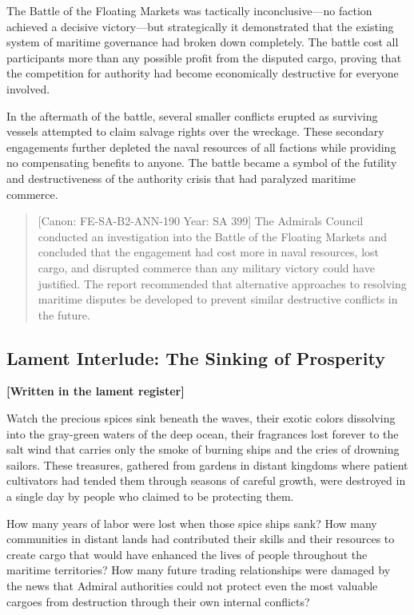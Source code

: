 The Battle of the Floating Markets was tactically inconclusive---no
faction achieved a decisive victory---but strategically it demonstrated
that the existing system of maritime governance had broken down
completely. The battle cost all participants more than any possible
profit from the disputed cargo, proving that the competition for
authority had become economically destructive for everyone involved.

In the aftermath of the battle, several smaller conflicts erupted as
surviving vessels attempted to claim salvage rights over the wreckage.
These secondary engagements further depleted the naval resources of all
factions while providing no compensating benefits to anyone. The battle
became a symbol of the futility and destructiveness of the authority
crisis that had paralyzed maritime commerce.

\begin{quote}
{[}Canon: FE-SA-B2-ANN-190 \textbar{} Year: SA 399{]} The
Admiral\textquotesingle s Council conducted an investigation into the
Battle of the Floating Markets and concluded that the engagement had
cost more in naval resources, lost cargo, and disrupted commerce than
any military victory could have justified. The report recommended that
alternative approaches to resolving maritime disputes be developed to
prevent similar destructive conflicts in the future.
\end{quote}

\subsection{Lament Interlude: The Sinking of
Prosperity}\label{lament-interlude-the-sinking-of-prosperity}

\textbf{{[}Written in the lament register{]}}

Watch the precious spices sink beneath the waves, their exotic colors
dissolving into the gray-green waters of the deep ocean, their
fragrances lost forever to the salt wind that carries only the smoke of
burning ships and the cries of drowning sailors. These treasures,
gathered from gardens in distant kingdoms where patient cultivators had
tended them through seasons of careful growth, were destroyed in a
single day by people who claimed to be protecting them.

How many years of labor were lost when those spice ships sank? How many
communities in distant lands had contributed their skills and their
resources to create cargo that would have enhanced the lives of people
throughout the maritime territories? How many future trading
relationships were damaged by the news that Admiral authorities could
not protect even the most valuable cargoes from destruction through
their own internal conflicts?

